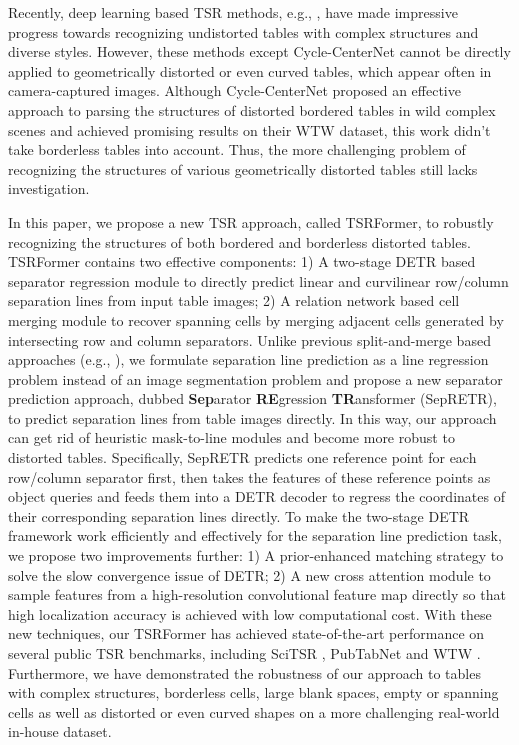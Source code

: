 \documentclass[sigconf]{acmart}
\begin{document}
Recently, deep learning based TSR methods, e.g., \cite{deepdesrt2017,paliwal2019tablenet,deeptabstr2019,rethinking2019,rethinkinggnn2019,SPLERGE,TabStruct2020,GTE2021,xue2021tgrnet,long2021parsing,FLAG2021,Qiao2021LGPMACT}, have made impressive progress towards recognizing undistorted tables with complex structures and diverse styles. However, these methods except Cycle-CenterNet \cite{long2021parsing} cannot be directly applied to geometrically distorted or even curved tables, which appear often in camera-captured images. Although Cycle-CenterNet \cite{long2021parsing} proposed an effective approach to parsing the structures of distorted bordered tables in wild complex scenes and achieved promising results on their WTW \cite{long2021parsing} dataset, this work didn't take borderless tables into account. Thus, the more challenging problem of recognizing the structures of various geometrically distorted tables still lacks investigation.

In this paper, we propose a new TSR approach, called TSRFormer, to robustly recognizing the structures of both bordered and borderless distorted tables. TSRFormer contains two effective components: 1) A two-stage DETR \cite{deformdetr2021} based separator regression module to directly predict linear and curvilinear row/column separation lines from input table images; 2) A relation network based cell merging module to recover spanning cells by merging adjacent cells generated by intersecting row and column separators. Unlike previous split-and-merge based approaches (e.g., \cite{SPLERGE}), we formulate separation line prediction as a line regression problem instead of an image segmentation problem and propose a new separator prediction approach, dubbed \textbf{Sep}arator \textbf{RE}gression \textbf{TR}ansformer (SepRETR), to predict separation lines from table images directly. In this way, our approach can get rid of heuristic mask-to-line modules and become more robust to distorted tables. Specifically, SepRETR predicts one reference point for each row/column separator first, then takes the features of these reference points as object queries and feeds them into a DETR \cite{detr2020} decoder to regress the coordinates of their corresponding separation lines directly. To make the two-stage DETR framework work efficiently and effectively for the separation line prediction task, we propose two improvements further: 1) A prior-enhanced matching strategy to solve the slow convergence issue of DETR; 2) A new cross attention module to sample features from a high-resolution convolutional feature map directly so that high localization accuracy is achieved with low computational cost. With these new techniques, our TSRFormer has achieved state-of-the-art performance on several public TSR benchmarks, including SciTSR \cite{chi2019complicated}, PubTabNet \cite{zhong2020image} and WTW \cite{long2021parsing}. Furthermore, we have demonstrated the robustness of our approach to tables with complex structures, borderless cells, large blank spaces, empty or spanning cells as well as distorted or even curved shapes on a more challenging real-world in-house dataset.
\end{document}
